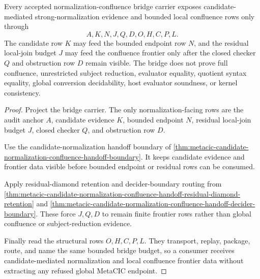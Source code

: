 \begin{theorem}
\label{thm:normalization-confluence-bridge-obligations}
Every accepted normalization-confluence bridge carrier exposes candidate-mediated strong-normalization evidence and bounded local confluence rows only through
$$
A,K,N,J,Q,D,O,H,C,P,L .
$$
The candidate row $K$ may feed the bounded endpoint row $N$, and the residual local-join budget $J$ may feed the confluence frontier only after the closed checker $Q$ and obstruction row $D$ remain visible. The bridge does not prove full confluence, unrestricted subject reduction, evaluator equality, quotient syntax equality, global conversion decidability, host evaluator soundness, or kernel consistency.
\end{theorem}
\begin{proof}
Project the bridge carrier. The only normalization-facing rows are the audit anchor $A$, candidate evidence $K$, bounded endpoint $N$, residual local-join budget $J$, closed checker $Q$, and obstruction row $D$.

Use the candidate-normalization handoff boundary of \autoref{thm:metacic-candidate-normalization-confluence-handoff-boundary}. It keeps candidate evidence and frontier data visible before bounded endpoint or residual rows can be consumed.

Apply residual-diamond retention and decider-boundary routing from \autoref{thm:metacic-candidate-normalization-confluence-handoff-residual-diamond-retention} and \autoref{thm:metacic-candidate-normalization-confluence-handoff-decider-boundary}. These force $J,Q,D$ to remain finite frontier rows rather than global confluence or subject-reduction evidence.

Finally read the structural rows $O,H,C,P,L$. They transport, replay, package, route, and name the same bounded bridge budget, so a consumer receives candidate-mediated normalization and local confluence frontier data without extracting any refused global MetaCIC endpoint.
\end{proof}

